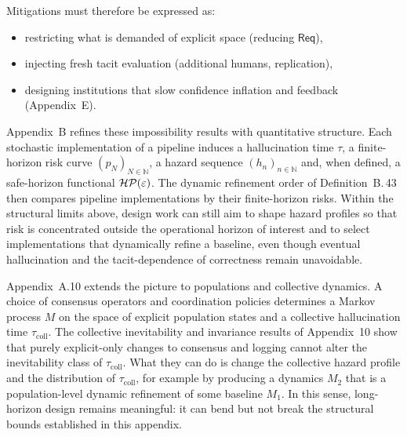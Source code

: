Mitigations must therefore be expressed as:
\begin{itemize}
  \item restricting what is demanded of explicit space (reducing $\mathsf{Req}$),
  \item injecting fresh tacit evaluation (additional humans, replication),
  \item designing institutions that slow confidence inflation and feedback (Appendix~E).
\end{itemize}
Appendix~B refines these impossibility results with quantitative
structure. Each stochastic implementation of a pipeline induces a
hallucination time $\tau$, a finite-horizon risk curve
$(p_N)_{N \in \mathbb{N}}$, a hazard sequence $(h_n)_{n \in \mathbb{N}}$
and, when defined, a safe-horizon functional $\mathcal{HP}(\varepsilon)$. The
dynamic refinement order of Definition~B.\,43 then compares pipeline
implementations by their finite-horizon risks. Within the structural
limits above, design work can still aim to shape hazard profiles so that
risk is concentrated outside the operational horizon of interest and to
select implementations that dynamically refine a baseline, even though
eventual hallucination and the tacit-dependence of correctness remain
unavoidable.

Appendix~A.10 extends the picture to populations and collective dynamics.
A choice of consensus operators and coordination policies determines a
Markov process $M$ on the space of explicit population states and a
collective hallucination time $\tau_{\mathrm{coll}}$. The collective
inevitability and invariance results of Appendix~10  show
that purely explicit-only changes to consensus and logging cannot alter
the inevitability class of $\tau_{\mathrm{coll}}$. What they can do is
change the collective hazard profile and the distribution of
$\tau_{\mathrm{coll}}$, for example by producing a dynamics $M_2$ that
is a population-level dynamic refinement of some baseline $M_1$. In
this sense, long-horizon design remains meaningful: it can bend but not
break the structural bounds established in this appendix.

